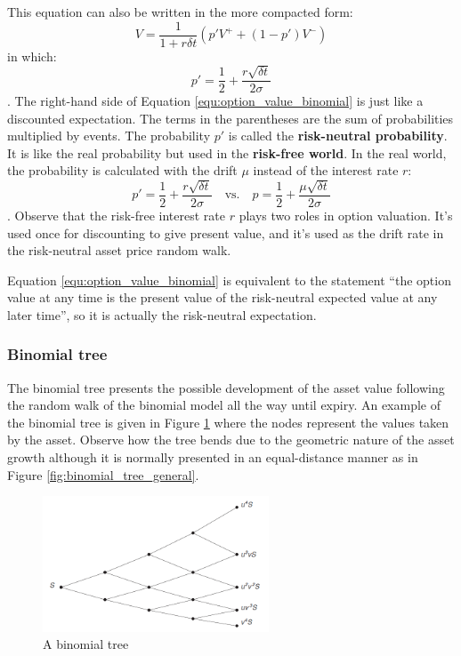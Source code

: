 This equation can also be written in the more compacted form:
\begin{equation}
    V = \frac{1}{1 + r \delta t} \left( p' V^+ + (1-p')V^- \right)
    \label{equ:option_value_binomial}
\end{equation}
in which:
\begin{equation}
    p' = \frac{1}{2} + \frac{r \sqrt{\delta t}}{2 \sigma}
\end{equation}.
The right-hand side of Equation \ref{equ:option_value_binomial} is just like a discounted expectation. The terms in the parentheses are the sum of probabilities multiplied by events. The probability $p'$ is called the \textbf{risk-neutral probability}. It is like the real probability but used in the \textbf{risk-free world}. In the real world, the probability is calculated with the drift $\mu$ instead of the interest rate $r$:
\begin{equation}
    p' = \frac{1}{2} + \frac{r \sqrt{\delta t}}{2 \sigma} \quad \text{vs.} \quad p = \frac{1}{2} + \frac{\mu \sqrt{\delta t}}{2 \sigma} 
\end{equation}. 
Observe that the risk-free interest rate $r$ plays two roles in option valuation. It's used once for discounting to give present value, and it's used as the drift rate in the risk-neutral asset price random walk.

Equation \ref{equ:option_value_binomial} is equivalent to the statement ``the option value at any time is the present value of the risk-neutral expected value at any later time'', so it is actually the risk-neutral expectation.



\subsubsection{Binomial tree}
The binomial tree presents the possible development of the asset value following the random walk of the binomial model all the way until expiry. An example of the binomial tree is given in Figure \ref{fig:binomial_math} where the nodes represent the values taken by the asset. Observe how the tree bends due to the geometric nature of the asset growth although it is normally presented in an equal-distance manner as in Figure \ref{fig:binomial_tree_general}. 

\begin{figure}[H]
    \centering
    \includegraphics[width=0.6\textwidth]{figure/binomial_math.png}
    \caption{A binomial tree}
    \label{fig:binomial_math}
\end{figure}

